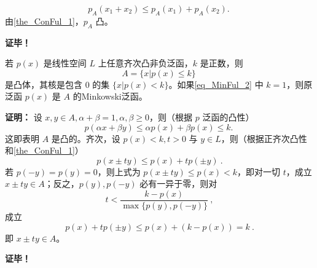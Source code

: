  \begin{equation}
p_A(x_1+x_2)\leq p_A(x_1)+p_A(x_2).~
 \end{equation}
 由\autoref{the_ConFul_1}，$p_A$ 凸。








\textbf{证毕！}

\begin{theorem}{}
若 $p(x)$ 是线性空间 $L$ 上任意齐次凸非负泛函，$k$ 是正数，则
\begin{equation}\label{eq_MinFul_2}
A=\{x|p(x)\leq k\}~
\end{equation}
是凸体，其核是包含 $0$ 的集 $\{x|p(x)<k\}$。如果\autoref{eq_MinFul_2} 中 $k=1$，则原泛函 $p(x)$ 是 $A$ 的Minkowski泛函。
\end{theorem}

\textbf{证明：}
设 $x,y\in A,\alpha+\beta=1,\alpha,\beta\geq0$，则（根据 $p$ 泛函的凸性）
\begin{equation}
p(\alpha x+\beta y)\leq\alpha p(x)+\beta p(x)\leq k.~
\end{equation}
这即表明 $A$ 是凸的。齐次，设 $p(x)<k,t>0$ 与 $y\in L$，则（根据正齐次凸性和\autoref{the_ConFul_1}）
\begin{equation}
p(x\pm ty)\leq p(x)+tp(\pm y)~.
\end{equation}
若 $p(-y)=p(y)=0$，则上式为 $p(x\pm ty)\leq p(x)<k$，即对一切 $t$，成立 $x\pm ty\in A$；反之，$p(y),p(-y)$ 必有一异于零，则对
\begin{equation}
t<\frac{k-p(x)}{\max\{p(y),p(-y)\}}~,
\end{equation}
成立
\begin{equation}
p(x)+tp(\pm y)\leq p(x)+(k-p(x))=k~.
\end{equation}
即 $x\pm ty\in A$。



\textbf{证毕！}
